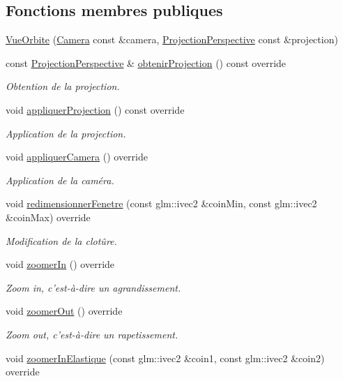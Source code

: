 \subsection*{Fonctions membres publiques}
\begin{DoxyCompactItemize}
\item 
\hyperlink{classvue_1_1_vue_orbite_a907006cfd1e4a8c621459f928ef437ff}{Vue\-Orbite} (\hyperlink{classvue_1_1_camera}{Camera} const \&camera, \hyperlink{classvue_1_1_projection_perspective}{Projection\-Perspective} const \&projection)
\item 
const \hyperlink{classvue_1_1_projection_perspective}{Projection\-Perspective} \& \hyperlink{classvue_1_1_vue_orbite_a99bfba1277c860c2d937a5887ccf0d61}{obtenir\-Projection} () const override
\begin{DoxyCompactList}\small\item\em Obtention de la projection. \end{DoxyCompactList}\item 
void \hyperlink{classvue_1_1_vue_orbite_a5ca4d6b88e45b395dbdb504fd8a0a961}{appliquer\-Projection} () const override
\begin{DoxyCompactList}\small\item\em Application de la projection. \end{DoxyCompactList}\item 
void \hyperlink{classvue_1_1_vue_orbite_ac84c35f66bce6659829cf8aee7fe46fb}{appliquer\-Camera} () override
\begin{DoxyCompactList}\small\item\em Application de la caméra. \end{DoxyCompactList}\item 
void \hyperlink{classvue_1_1_vue_orbite_ae0dd98baf62be981efeac26a5eedd2ae}{redimensionner\-Fenetre} (const glm\-::ivec2 \&coin\-Min, const glm\-::ivec2 \&coin\-Max) override
\begin{DoxyCompactList}\small\item\em Modification de la clotûre. \end{DoxyCompactList}\item 
void \hyperlink{classvue_1_1_vue_orbite_a2e2b653b7fb1c75a8671e189b2d62f71}{zoomer\-In} () override
\begin{DoxyCompactList}\small\item\em Zoom in, c'est-\/à-\/dire un agrandissement. \end{DoxyCompactList}\item 
void \hyperlink{classvue_1_1_vue_orbite_ac134e81992177a37078393a406943f12}{zoomer\-Out} () override
\begin{DoxyCompactList}\small\item\em Zoom out, c'est-\/à-\/dire un rapetissement. \end{DoxyCompactList}\item 
\hypertarget{classvue_1_1_vue_orbite_a7b7d2481a93e94e86e6dc19bfc65496a}{void \hyperlink{classvue_1_1_vue_orbite_a7b7d2481a93e94e86e6dc19bfc65496a}{zoomer\-In\-Elastique} (const glm\-::ivec2 \&coin1, const glm\-::ivec2 \&coin2) override}\label{classvue_1_1_vue_orbite_a7b7d2481a93e94e86e6dc19bfc65496a}


\end{DoxyCompactItemize}
